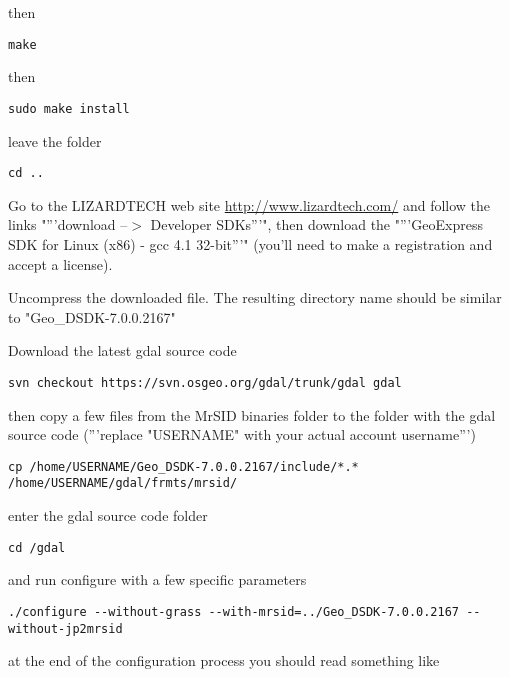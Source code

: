 then

\begin{verbatim}
make
\end{verbatim}

then

\begin{verbatim}
sudo make install
\end{verbatim}

leave the folder 

\begin{verbatim}
cd ..
\end{verbatim}

\hypertarget{toc57}{}
Go to the LIZARDTECH web site \url{http://www.lizardtech.com/} and follow the links
"'''download --$>$ Developer SDKs'''", 
then download the "'''GeoExpress SDK for Linux (x86) - gcc 4.1 32-bit'''"
(you'll need to make a registration and accept a license).

Uncompress the downloaded file. The resulting directory name should be similar to "Geo\_DSDK-7.0.0.2167"

\hypertarget{toc58}{}
Download the latest gdal source code

\begin{verbatim}
svn checkout https://svn.osgeo.org/gdal/trunk/gdal gdal
\end{verbatim}

then copy a few files from the MrSID binaries folder to the folder with the gdal source code
('''replace "USERNAME" with your actual account username''')

\begin{verbatim}
cp /home/USERNAME/Geo_DSDK-7.0.0.2167/include/*.* /home/USERNAME/gdal/frmts/mrsid/
\end{verbatim}

enter the gdal source code folder

\begin{verbatim}
cd /gdal
\end{verbatim}

and run configure with a few specific parameters

\begin{verbatim}
./configure --without-grass --with-mrsid=../Geo_DSDK-7.0.0.2167 --without-jp2mrsid
\end{verbatim}

at the end of the configuration process you should read something like

